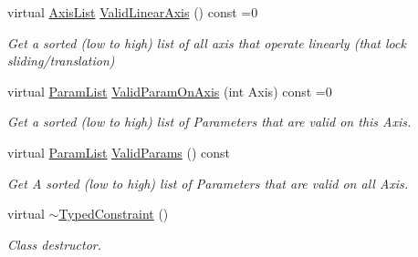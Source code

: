 \begin{DoxyCompactItemize}
virtual \hyperlink{classphys_1_1TypedConstraint_a26261a4055e84e104c58d84eea5667c2}{AxisList} \hyperlink{classphys_1_1TypedConstraint_af9d5a6630d5f384825388a1e73c88b3a}{ValidLinearAxis} () const =0
\begin{DoxyCompactList}\small\item\em Get a sorted (low to high) list of all axis that operate linearly (that lock sliding/translation) \item\end{DoxyCompactList}\item 
virtual \hyperlink{classphys_1_1TypedConstraint_a4c2dcea3fbb764e454840329126d034e}{ParamList} \hyperlink{classphys_1_1TypedConstraint_af9f4c03dbba0d55e60dce341dbdc1105}{ValidParamOnAxis} (int Axis) const =0
\begin{DoxyCompactList}\small\item\em Get a sorted (low to high) list of Parameters that are valid on this Axis. \item\end{DoxyCompactList}\item 
virtual \hyperlink{classphys_1_1TypedConstraint_a4c2dcea3fbb764e454840329126d034e}{ParamList} \hyperlink{classphys_1_1TypedConstraint_ad061a210a8d870bd9be0ff01a5509549}{ValidParams} () const 
\begin{DoxyCompactList}\small\item\em Get A sorted (low to high) list of Parameters that are valid on all Axis. \item\end{DoxyCompactList}\item 
virtual \hyperlink{classphys_1_1TypedConstraint_a7489628bcfb15e712c09dbdcf6b20bff}{$\sim$TypedConstraint} ()
\begin{DoxyCompactList}\small\item\em Class destructor. \item\end{DoxyCompactList}\end{DoxyCompactItemize}
